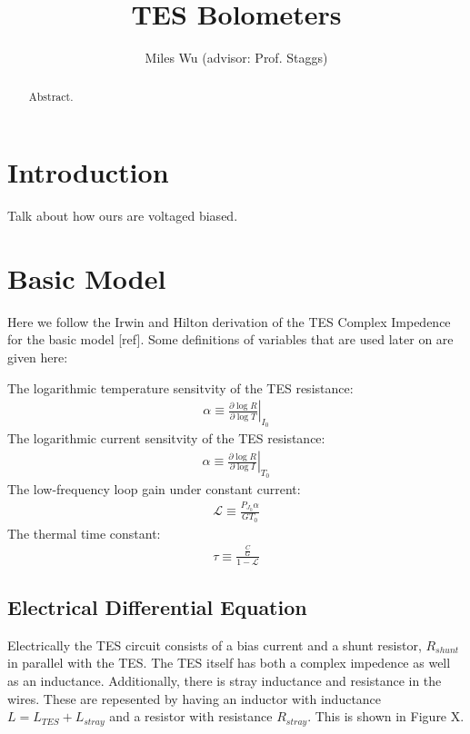 \documentclass[letterpaper,10pt]{article}
\begin{document}
\title{TES Bolometers}
\author{Miles Wu (advisor: Prof. Staggs)}
\maketitle

\begin{abstract}
Abstract.
\end{abstract}

\section{Introduction}

Talk about how ours are voltaged biased.

\section{Basic Model}
Here we follow the Irwin and Hilton derivation of the TES Complex Impedence for the basic model [ref]. Some definitions of variables that are used later on are given here:

The logarithmic temperature sensitvity of the TES resistance: \begin{eqnarray}\alpha \equiv \left.\frac{\partial \log R}{\partial \log T}\right|_{I_0}\end{eqnarray}
The logarithmic current sensitvity of the TES resistance:
\begin{eqnarray}
	\alpha \equiv \left.\frac{\partial \log R}{\partial \log I}\right|_{T_0} \label{log1}
\end{eqnarray}
The low-frequency loop gain under constant current:
\begin{eqnarray}
	\mathcal{L} \equiv \frac{P_{J_0} \alpha}{G T_0} \label{log2}
\end{eqnarray}
The thermal time constant:
\begin{eqnarray}
	\tau \equiv \frac{\frac{C}{G}}{1 - \mathcal{L}}
\end{eqnarray}

\subsection{Electrical Differential Equation}
Electrically the TES circuit consists of a bias current and a shunt resistor, $R_{shunt}$ in parallel with the TES. The TES itself has both a complex impedence as well as an inductance. Additionally, there is stray inductance and resistance in the wires. These are repesented by having an inductor with inductance $L = L_{TES} + L_{stray}$ and a resistor with resistance $R_{stray}$. This is shown in Figure X.
\end{document}
